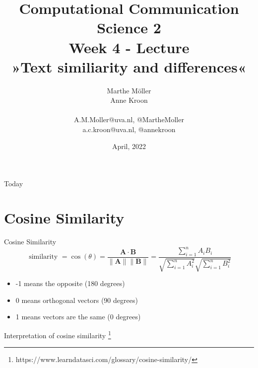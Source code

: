 \documentclass[compress]{beamer}
\title[Computational Communication Science 2]{\textbf{Computational Communication Science 2} \\Week 4 - Lecture\\ »Text similiarity and differences«}
\author[Marthe Möller, Anne Kroon]{Marthe Möller \\ Anne Kroon \\ ~ \\ \footnotesize{A.M.Moller@uva.nl, @MartheMoller \\a.c.kroon@uva.nl, @annekroon} \\}
\date{April, 2022}
\institute[Digital Society Minor, University of Amsterdam]{Digital Society Minor, University of Amsterdam}
\begin{document}
	
	\begin{frame}{}
		\titlepage
	\end{frame}
	
\begin{frame}{Today}
	\tableofcontents
\end{frame}

\section{Cosine Similarity}

\begin{frame}{Cosine Similarity} 
$$
\text { similarity }=\cos (\theta)=\frac{\mathbf{A} \cdot \mathbf{B}}{\|\mathbf{A}\|\|\mathbf{B}\|}=\frac{\sum_{i=1}^{n} A_{i} B_{i}}{\sqrt{\sum_{i=1}^{n} A_{i}^{2}} \sqrt{\sum_{i=1}^{n} B_{i}^{2}}}
$$

\pause

\begin{itemize}
\item -1 means the opposite (180 degrees) 
\item 0 means orthogonal vectors (90 degrees)
\item 1 means vectors are the same (0 degrees)
\end{itemize}
\end{frame}


\begin{frame}
Interpretation of cosine similarity  \footnote{https://www.learndatasci.com/glossary/cosine-similarity/}
\end{frame}
\end{document}
